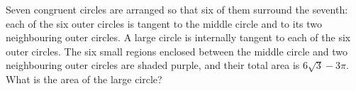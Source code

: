 Seven congruent circles are arranged so that six of them surround the seventh: each of the six outer circles is tangent to the middle circle and to its two neighbouring outer circles. A large circle is internally tangent to each of the six outer circles. The six small regions enclosed between the middle circle and two neighbouring outer circles are shaded purple, and their total area is $6\sqrt3-3\pi$. What is the area of the large circle?
